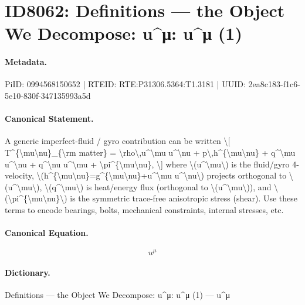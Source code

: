 \section*{ID8062: Definitions — the Object We Decompose: u\textasciicircum{}μ: u\textasciicircum{}μ (1)}
\paragraph{Metadata.}
PiID: 0994568150652 | RTEID: RTE:P31306.5364:T1.3181 | UUID: 2ea8c183-f1c6-5e10-830f-347135993a5d

\paragraph{Canonical Statement.}
A generic imperfect-fluid / gyro contribution can be written \textbackslash{}[ T\textasciicircum{}\{\textbackslash{}mu\textbackslash{}nu\}\_\{\textbackslash{}rm matter\} = \textbackslash{}rho\textbackslash{},u\textasciicircum{}\textbackslash{}mu u\textasciicircum{}\textbackslash{}nu + p\textbackslash{},h\textasciicircum{}\{\textbackslash{}mu\textbackslash{}nu\} + q\textasciicircum{}\textbackslash{}mu u\textasciicircum{}\textbackslash{}nu + q\textasciicircum{}\textbackslash{}nu u\textasciicircum{}\textbackslash{}mu + \textbackslash{}pi\textasciicircum{}\{\textbackslash{}mu\textbackslash{}nu\}, \textbackslash{}] where \textbackslash{}(u\textasciicircum{}\textbackslash{}mu\textbackslash{}) is the fluid/gyro 4-velocity, \textbackslash{}(h\textasciicircum{}\{\textbackslash{}mu\textbackslash{}nu\}=g\textasciicircum{}\{\textbackslash{}mu\textbackslash{}nu\}+u\textasciicircum{}\textbackslash{}mu u\textasciicircum{}\textbackslash{}nu\textbackslash{}) projects orthogonal to \textbackslash{}(u\textasciicircum{}\textbackslash{}mu\textbackslash{}), \textbackslash{}(q\textasciicircum{}\textbackslash{}mu\textbackslash{}) is heat/energy flux (orthogonal to \textbackslash{}(u\textasciicircum{}\textbackslash{}mu\textbackslash{})), and \textbackslash{}(\textbackslash{}pi\textasciicircum{}\{\textbackslash{}mu\textbackslash{}nu\}\textbackslash{}) is the symmetric trace-free anisotropic stress (shear). Use these terms to encode bearings, bolts, mechanical constraints, internal stresses, etc.

\paragraph{Canonical Equation.}
\[
u^\mu
\]

\paragraph{Dictionary.}
Definitions — the Object We Decompose: u\textasciicircum{}μ: u\textasciicircum{}μ (1) — u\textasciicircum{}μ

